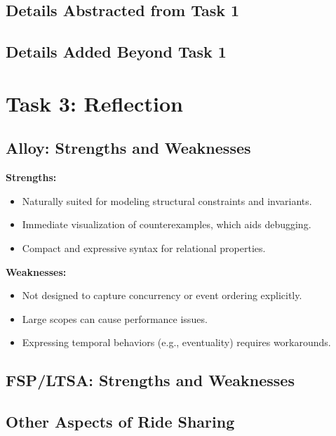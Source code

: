 \documentclass[11pt]{article}
\begin{document}

\subsection{Details Abstracted from Task 1}


\subsection{Details Added Beyond Task 1}


\section{Task 3: Reflection}
\label{sec:task3}

\subsection{Alloy: Strengths and Weaknesses}

\textbf{Strengths:}
\begin{itemize}[leftmargin=1.5em]
  \item Naturally suited for modeling structural constraints and invariants.
  \item Immediate visualization of counterexamples, which aids debugging.
  \item Compact and expressive syntax for relational properties.
\end{itemize}
\textbf{Weaknesses:}
\begin{itemize}[leftmargin=1.5em]
  \item Not designed to capture concurrency or event ordering explicitly.
  \item Large scopes can cause performance issues.
  \item Expressing temporal behaviors (e.g., eventuality) requires workarounds.
\end{itemize}

\subsection{FSP/LTSA: Strengths and Weaknesses}


\subsection{Other Aspects of Ride Sharing}
\end{document}
